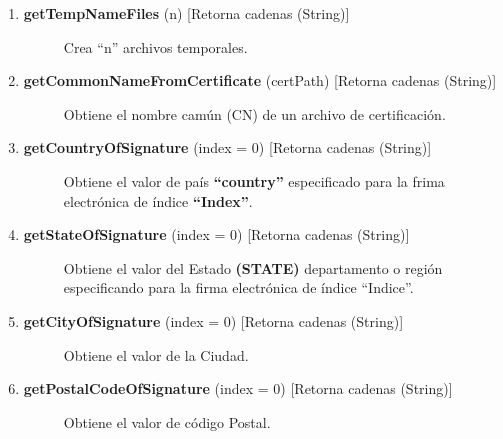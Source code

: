 \documentclass[letterpaper,11pt,spanish]{sphinxmanual}
\begin{document}
\begin{description}
\begin{enumerate}
\item {} \begin{description}
\item[{\textbf{getTempNameFiles} (n) {[}Retorna cadenas (String){]}}] \leavevmode
Crea ``n'' archivos temporales.

\end{description}

\item {} \begin{description}
\item[{\textbf{getCommonNameFromCertificate} (certPath) {[}Retorna cadenas (String){]}}] \leavevmode
Obtiene el nombre camún (CN) de un archivo de certificación.

\end{description}

\item {} \begin{description}
\item[{\textbf{getCountryOfSignature} (index = 0) {[}Retorna cadenas (String){]}}] \leavevmode
Obtiene el valor de país \textbf{``country''} especificado para la frima electrónica de índice \textbf{``Index''}.

\end{description}

\item {} \begin{description}
\item[{\textbf{getStateOfSignature} (index = 0) {[}Retorna cadenas (String){]}}] \leavevmode
Obtiene el valor del Estado \textbf{(STATE)} departamento o región especificando para la firma electrónica de índice ``Indice''.

\end{description}

\item {} \begin{description}
\item[{\textbf{getCityOfSignature} (index = 0) {[}Retorna cadenas (String){]}}] \leavevmode
Obtiene el valor de la Ciudad.

\end{description}

\item {} \begin{description}
\item[{\textbf{getPostalCodeOfSignature} (index = 0) {[}Retorna cadenas (String){]}}] \leavevmode
Obtiene el valor de código Postal.

\end{description}


\end{enumerate}
\end{description}
\end{document}
